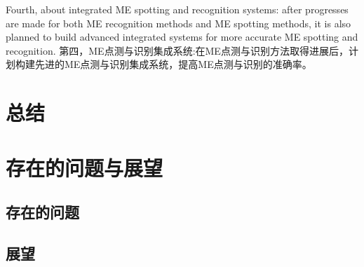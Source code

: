 Fourth, about integrated ME spotting and recognition systems: after progresses are made for both ME recognition methods and ME spotting methods, it is also planned to build advanced integrated systems for more accurate ME spotting and recognition.
第四，ME点测与识别集成系统:在ME点测与识别方法取得进展后，计划构建先进的ME点测与识别集成系统，提高ME点测与识别的准确率。

\section{总结}


\section{存在的问题与展望}

\subsection{存在的问题}

\subsection{展望}
